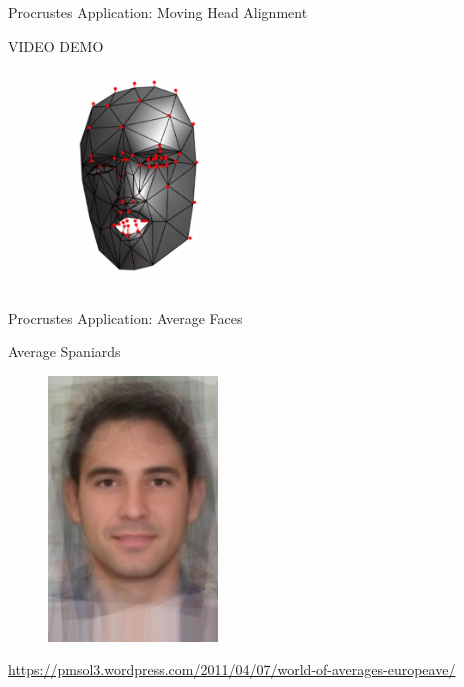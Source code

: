 \documentclass{beamer}
\begin{document}
\begin{frame}{Procrustes Application: Moving Head Alignment}

VIDEO DEMO

\begin{figure}[t]
	\centering
    \includegraphics[width=0.4\textwidth]{MeProcrustes.png}
\end{figure}

\end{frame}


\begin{frame}{Procrustes Application: Average Faces}

Average Spaniards

\begin{figure}[t]
\centering
  \includegraphics[width=0.4\textwidth]{averagespaniardmale.jpg}%
\end{figure}

\tiny \url{https://pmsol3.wordpress.com/2011/04/07/world-of-averages-europeave/}

\end{frame}
\end{document}

